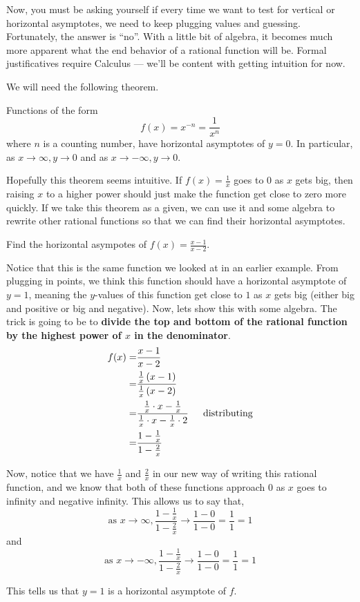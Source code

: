 \documentclass{ximera}
\begin{document}
Now, you must be asking yourself if every time we want to test for vertical or horizontal asymptotes, we need to keep plugging values and guessing. Fortunately, the answer is ``no''.   With a little bit of algebra, it becomes much more apparent what the end behavior of a rational function will be.  Formal justificatives require Calculus --- we'll be content with getting intuition for now.

We will need the following theorem.

\begin{theorem}
Functions of the form $$f(x)=x^{-n}=\frac{1}{x^n}$$ where $n$ is a counting number, have horizontal asymptotes of $y=0$.  In particular, as $x \rightarrow \infty, y \rightarrow 0$ and   as $x \rightarrow -\infty, y \rightarrow 0$.
\end{theorem}

Hopefully this theorem seems intuitive.  If $f(x)=\frac{1}{x}$ goes to 0 as $x$ gets big, then raising $x$ to a higher power should just make the function get close to zero more quickly.  If we take this theorem as a given, we can use it and some algebra to rewrite other rational functions so that we can find their horizontal asymptotes.

\begin{example}  Find the horizontal asympotes of $f(x) = \frac{x-1}{x-2}$.

\begin{explanation}
Notice that this is the same function we looked at in an earlier example.  From plugging in points, we think this function should have a horizontal asymptote of $y=1$, meaning the $y$-values of this function get close to $1$ as $x$ gets big (either big and positive or big and negative).  Now, lets show this with some algebra.  The trick is going to be to \textbf{divide the top and bottom of the rational function by the highest power of $x$ in the denominator}.
\begin{align*}
f(x) =& \frac{x-1}{x-2}\\
=& \frac{\frac{1}{x}\left(x-1\right)}{\frac{1}{x}\left(x-2\right)} \\
=& \frac{\frac{1}{x} \cdot x-\frac{1}{x}}{\frac{1}{x}\cdot x-\frac{1}{x} \cdot 2} \text{ \, \,\,    distributing} \\
=& \frac{1-\frac{1}{x}}{1-\frac{2}{x}} \\
\end{align*}

Now, notice that we have $\frac{1}{x}$ and $\frac{2}{x}$ in our new way of writing this rational function, and we know that both of these functions approach $0$ as $x$ goes to infinity and negative infinity.  This allows us to say  that,
\[
\text{as } x \rightarrow \infty, \frac{1-\frac{1}{x}}{1-\frac{2}{x}} \rightarrow \frac{1-0}{1-0}=\frac{1}{1}=1
\]
and
\[
\text{as } x \rightarrow -\infty, \frac{1-\frac{1}{x}}{1-\frac{2}{x}} \rightarrow \frac{1-0}{1-0}=\frac{1}{1}=1
\]

This tells us that $y=1$ is a horizontal asymptote of $f$.
\end{explanation}
\end{example}
\end{document}
